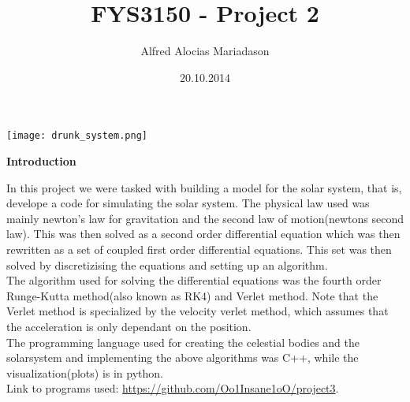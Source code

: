 \documentclass[11 pt, a4 paper]{article}
\title{FYS3150 - Project 2}
\author{Alfred Alocias Mariadason}
\date{20.10.2014}
\newenvironment{tabbed}{\begin{addmargin}{0.1cm}}{\end{addmargin}}
\newcommand{\sectiontitle}[1]{\begin{center} \Large\textbf{{#1}} \end{center}}
\newcommand{\vsp}{\vspace{0.2cm}}
\begin{document}
\maketitle

\begin{center}
    \texttt{[image: drunk\_system.png]}
\end{center}

\newpage

\sectiontitle{Introduction}
    \begin{tabbed}
        In this project we were tasked with building a model for the solar system, that is, develope a code for simulating the solar system. The physical law used was mainly newton's law for gravitation and the second law of motion(newtons second law). This was then solved as a second order differential equation which was then rewritten as a set of coupled first order differential equations. This set was then solved by discretizising the equations and setting up an algorithm.\vsp\\
        The algorithm used for solving the differential equations was the fourth order Runge-Kutta method(also known as RK4) and Verlet method. Note that the Verlet method is specialized by the velocity verlet method, which assumes that the acceleration is only dependant on the position. \vsp\\
        The programming language used for creating the celestial bodies and the solarsystem and implementing the above algorithms was C++, while the visualization(plots) is in python.\vsp\\
        Link to programs used: \url{https://github.com/Oo1Insane1oO/project3}.
    \end{tabbed}\vsp
\end{document}
